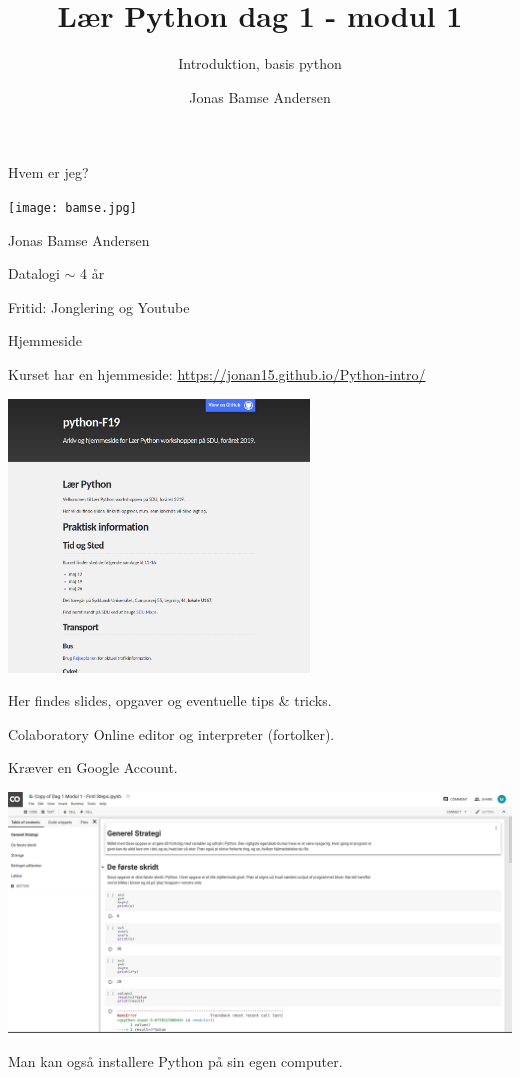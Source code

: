 \documentclass{beamer}
\title{Lær Python dag 1 - modul 1}
\subtitle{Introduktion, basis python}
\date{}
\author[JBA]{Jonas Bamse Andersen}
\institute{Institut for Matematik og Datalogi - IMADA \\
	Syddansk Universitet}
\begin{document}
	
\maketitle
\begin{frame}{Hvem er jeg?}
\begin{center}
\texttt{[image: bamse.jpg]}

Jonas Bamse Andersen

Datalogi $\sim$ 4 år

Fritid: Jonglering og Youtube
\end{center}
\end{frame}

\begin{frame}{Hjemmeside}
\addtocounter{framenumber}{-1}

Kurset har en hjemmeside: \url{https://jonan15.github.io/Python-intro/}
\begin{center}
\includegraphics[trim={0 5cm 0 0}, clip, width=0.6\textwidth]{webpage.png}
\end{center}

Her findes slides, opgaver og eventuelle tips \& tricks.	
\end{frame}


\begin{frame}{Colaboratory}
Online editor og interpreter (fortolker).

Kræver en Google Account.

\begin{center}
	\includegraphics[width=\textwidth]{colaboratory.png}
\end{center}

Man kan også installere Python på sin egen computer.
\end{frame}
\end{document}
